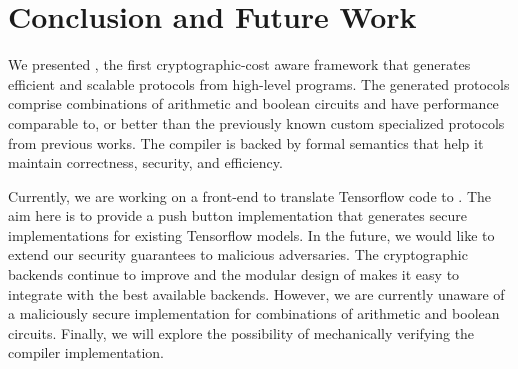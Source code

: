\section{Conclusion and Future Work}
\label{sec:conclude}

We presented \tool, the first
cryptographic-cost aware framework that generates efficient and
scalable \mpc protocols from high-level programs.
The generated protocols comprise combinations
of arithmetic and boolean circuits and have performance comparable to, or better than the previously known custom specialized
protocols from previous works.
The compiler is backed by formal semantics that help 
it maintain correctness, security,
and efficiency.

Currently, we are working on a front-end to translate Tensorflow code to \tool. The aim here is to provide a push button implementation  that generates secure implementations for existing Tensorflow models.  
In the future, we would like to extend our security guarantees to malicious adversaries. 
 The cryptographic backends continue to improve and the modular design of \tool makes it easy to integrate with the best available backends.
However, we are currently unaware of a maliciously secure \mpc implementation for combinations of
arithmetic and boolean circuits.
Finally, we will explore the possibility of mechanically verifying the  compiler implementation.






